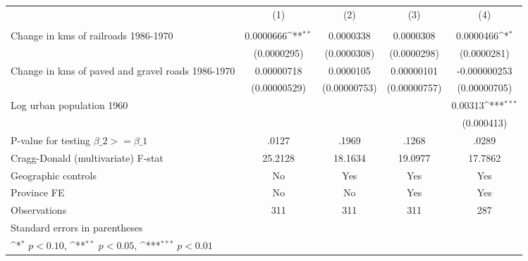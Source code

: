{
\def\sym#1{\ifmmode^{#1}\else\(^{#1}\)\fi}
\begin{tabular}{l*{4}{c}}
\hline\hline
                &\multicolumn{1}{c}{(1)}&\multicolumn{1}{c}{(2)}&\multicolumn{1}{c}{(3)}&\multicolumn{1}{c}{(4)}\\
                &\multicolumn{1}{c}{}&\multicolumn{1}{c}{}&\multicolumn{1}{c}{}&\multicolumn{1}{c}{}\\
\hline
Change in kms of railroads 1986-1970&0.0000666\sym{**} &0.0000338         &0.0000308         &0.0000466\sym{*}  \\
                &(0.0000295)         &(0.0000308)         &(0.0000298)         &(0.0000281)         \\
[1em]
Change in kms of paved and gravel roads 1986-1970&0.00000718         &0.0000105         &0.00000101         &-0.000000253         \\
                &(0.00000529)         &(0.00000753)         &(0.00000757)         &(0.00000705)         \\
[1em]
Log urban population 1960&                  &                  &                  &  0.00313\sym{***}\\
                &                  &                  &                  &(0.000413)         \\
\hline
P-value for testing $\beta\_{2} >= \beta\_{1}$&    .0127         &    .1969         &    .1268         &    .0289         \\
Cragg-Donald (multivariate) F-stat&  25.2128         &  18.1634         &  19.0977         &  17.7862         \\
Geographic controls&       No         &      Yes         &      Yes         &      Yes         \\
Province FE     &       No         &       No         &      Yes         &      Yes         \\
Observations    &      311         &      311         &      311         &      287         \\
\hline\hline
\multicolumn{5}{l}{\footnotesize Standard errors in parentheses}\\
\multicolumn{5}{l}{\footnotesize \sym{*} \(p<0.10\), \sym{**} \(p<0.05\), \sym{***} \(p<0.01\)}\\
\end{tabular}
}
